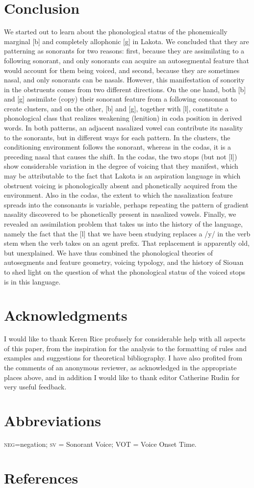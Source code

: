 \documentclass[output=paper]{LSP/langsci}
\begin{document}
\section{Conclusion}

We started out to learn about the phonological status of the phonemically marginal [b] and completely allophonic [g] in Lakota. We concluded that they are patterning as sonorants for two reasons: first, because they are assimilating to a following sonorant, and only sonorants can acquire an autosegmental feature that would account for them being voiced, and second, because they are sometimes nasal, and only sonorants can be nasals. However, this manifestation of sonority in the obstruents comes from two different directions. On the one hand, both [b] and [g] assimilate (copy) their sonorant feature from a following consonant to create clusters, and on the other, [b] and [g], together with [l], constitute a phonological class that realizes weakening (lenition) in coda position in derived words. In both patterns, an adjacent nasalized vowel can contribute its nasality to the sonorants, but in different ways for each pattern. In the clusters, the conditioning environment follows the sonorant, whereas in the codas, it is a preceding nasal that causes the shift. In the codas, the two stops (but not [l]) show considerable variation in the degree of voicing that they manifest, which may be attributable to the fact that Lakota is an aspiration language in which obstruent voicing is phonologically absent and phonetically acquired from the environment. Also in the codas, the extent to which the nasalization feature spreads into the consonants is variable, perhaps repeating the pattern of gradient nasality discovered to be phonetically present in nasalized vowels. Finally, we revealed an assimilation problem that takes us into the history of the language, namely the fact that the [l] that we have been studying replaces a /y/ in the verb stem when the verb takes on an agent prefix. That replacement is apparently old, but unexplained.
We have thus combined the phonological theories of autosegments and feature geometry, voicing typology, and the history of Siouan to shed light on the question of what the phonological status of the voiced stops is in this language.

\section*{Acknowledgments}

I would like to thank Keren Rice profusely for considerable help with all aspects of this paper, from the inspiration for the analysis to the formatting of rules and examples and suggestions for theoretical bibliography. I have also profited from the comments of an anonymous reviewer, as acknowledged in the appropriate places above, and in addition I would like to thank editor Catherine Rudin for very useful feedback.

\section*{Abbreviations}
\textsc{neg}=negation; \textsc{sv} = Sonorant Voice; VOT = Voice Onset Time.

\section*{References}

\nocite{Rice2013}
\printbibliography[heading=subbibliography,notkeyword=this]
 
\end{document}

